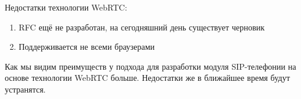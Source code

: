 Недостатки технологии WebRTC:
\begin{enumerate}
\item RFC ещё не разработан, на сегодняшний день существует черновик\cite{WebRTC_W3C}
\item Поддерживается не всеми браузерами
\end{enumerate}

Как мы видим преимуществ у подхода для разработки модуля SIP-телефонии на основе технологии WebRTC больше. Недостатки же в ближайшее время будут устранятся.
